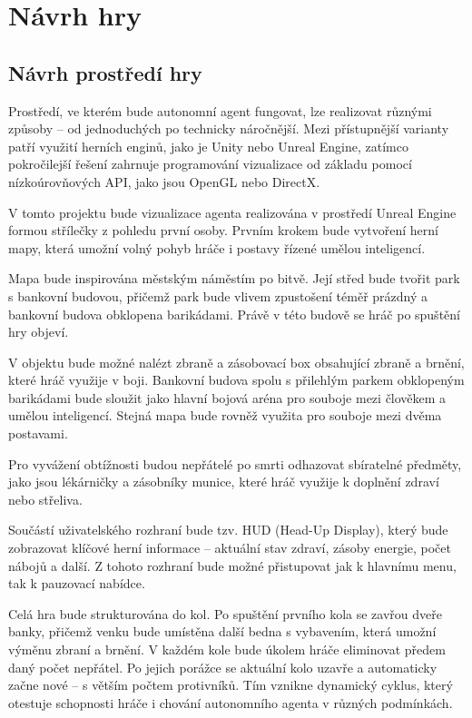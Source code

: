 \newpage

\section{Návrh hry}
\subsection{Návrh prostředí hry}
Prostředí, ve kterém bude autonomní agent fungovat, lze realizovat různými způsoby – od jednoduchých po technicky náročnější. Mezi přístupnější varianty patří využití herních enginů, jako je Unity nebo Unreal Engine, zatímco pokročilejší řešení zahrnuje programování vizualizace od základu pomocí nízkoúrovňových API, jako jsou OpenGL nebo DirectX.

V tomto projektu bude vizualizace agenta realizována v prostředí Unreal Engine formou střílečky z pohledu první osoby. Prvním krokem bude vytvoření herní mapy, která umožní volný pohyb hráče i postavy řízené umělou inteligencí.

Mapa bude inspirována městským náměstím po bitvě. Její střed bude tvořit park s bankovní budovou, přičemž park bude vlivem zpustošení téměř prázdný a bankovní budova obklopena barikádami. Právě v této budově se hráč po spuštění hry objeví.

V objektu bude možné nalézt zbraně a zásobovací box obsahující zbraně a brnění, které hráč využije v boji. Bankovní budova spolu s přilehlým parkem obklopeným barikádami bude sloužit jako hlavní bojová aréna pro souboje mezi člověkem a umělou inteligencí. Stejná mapa bude rovněž využita pro souboje mezi dvěma postavami.

Pro vyvážení obtížnosti budou nepřátelé po smrti odhazovat sbíratelné předměty, jako jsou lékárničky a zásobníky munice, které hráč využije k doplnění zdraví nebo střeliva.

Součástí uživatelského rozhraní bude tzv. HUD (Head-Up Display), který bude zobrazovat klíčové herní informace – aktuální stav zdraví, zásoby energie, počet nábojů a další. Z tohoto rozhraní bude možné přistupovat jak k hlavnímu menu, tak k pauzovací nabídce.

Celá hra bude strukturována do kol. Po spuštění prvního kola se zavřou dveře banky, přičemž venku bude umístěna další bedna s vybavením, která umožní výměnu zbraní a brnění. V každém kole bude úkolem hráče eliminovat předem daný počet nepřátel. Po jejich porážce se aktuální kolo uzavře a automaticky začne nové – s větším počtem protivníků. Tím vznikne dynamický cyklus, který otestuje schopnosti hráče i chování autonomního agenta v různých podmínkách.

